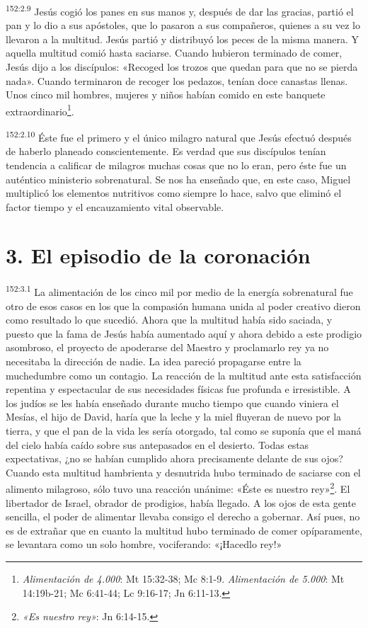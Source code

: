 \par
\textsuperscript{152:2.9} Jesús cogió los panes en sus manos y, después de dar las gracias, partió el pan y lo dio a sus apóstoles, que lo pasaron a sus compañeros, quienes a su vez lo llevaron a la multitud. Jesús partió y distribuyó los peces de la misma manera. Y aquella multitud comió hasta saciarse. Cuando hubieron terminado de comer, Jesús dijo a los discípulos: «Recoged los trozos que quedan para que no se pierda nada». Cuando terminaron de recoger los pedazos, tenían doce canastas llenas. Unos cinco mil hombres, mujeres y niños habían comido en este banquete extraordinario\footnote{\textit{Alimentación de 4.000}: Mt 15:32-38; Mc 8:1-9. \textit{Alimentación de 5.000}: Mt 14:19b-21; Mc 6:41-44; Lc 9:16-17; Jn 6:11-13.}.

\par
\textsuperscript{152:2.10} Éste fue el primero y el único milagro natural que Jesús efectuó después de haberlo planeado conscientemente. Es verdad que sus discípulos tenían tendencia a calificar de milagros muchas cosas que no lo eran, pero éste fue un auténtico ministerio sobrenatural. Se nos ha enseñado que, en este caso, Miguel multiplicó los elementos nutritivos como siempre lo hace, salvo que eliminó el factor tiempo y el encauzamiento vital observable.

\section*{3. El episodio de la coronación}
\par
\textsuperscript{152:3.1} La alimentación de los cinco mil por medio de la energía sobrenatural fue otro de esos casos en los que la compasión humana unida al poder creativo dieron como resultado lo que sucedió. Ahora que la multitud había sido saciada, y puesto que la fama de Jesús había aumentado aquí y ahora debido a este prodigio asombroso, el proyecto de apoderarse del Maestro y proclamarlo rey ya no necesitaba la dirección de nadie. La idea pareció propagarse entre la muchedumbre como un contagio. La reacción de la multitud ante esta satisfacción repentina y espectacular de sus necesidades físicas fue profunda e irresistible. A los judíos se les había enseñado durante mucho tiempo que cuando viniera el Mesías, el hijo de David, haría que la leche y la miel fluyeran de nuevo por la tierra, y que el pan de la vida les sería otorgado, tal como se suponía que el maná del cielo había caído sobre sus antepasados en el desierto. Todas estas expectativas, ¿no se habían cumplido ahora precisamente delante de sus ojos? Cuando esta multitud hambrienta y desnutrida hubo terminado de saciarse con el alimento milagroso, sólo tuvo una reacción unánime: «Éste es nuestro rey»\footnote{\textit{«Es nuestro rey»}: Jn 6:14-15.}. El libertador de Israel, obrador de prodigios, había llegado. A los ojos de esta gente sencilla, el poder de alimentar llevaba consigo el derecho a gobernar. Así pues, no es de extrañar que en cuanto la multitud hubo terminado de comer opíparamente, se levantara como un solo hombre, vociferando: «¡Hacedlo rey!»

